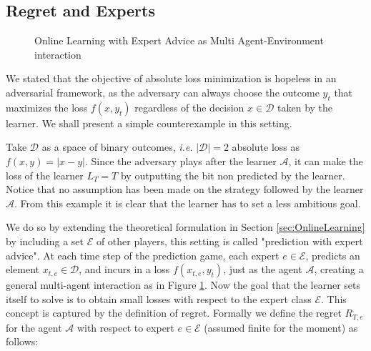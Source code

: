 


\subsection{Regret and Experts}
\begin{figure}[t!]
    \centering
    
\caption{Online Learning with Expert Advice as Multi Agent-Environment interaction}
\label{fig:OL}
\end{figure}
We stated that the objective of absolute loss minimization is hopeless in an adversarial framework, as the adversary can always choose the outcome $y_t$ that maximizes the loss $f(x,y_t)$ regardless of the decision $x\in\mathcal D$ taken by the learner. We shall present a simple counterexample in this setting.

Take $\mathcal D$ as a space of binary outcomes, \emph{i.e.} $|\mathcal D|=2$ absolute loss as $f(x,y)=|x - y|$. Since the adversary plays after the learner $\mathcal A$, it can  make the loss of the learner $L_T=T$ by outputting the bit non predicted by the learner. Notice that no assumption has been made on the strategy followed by the learner $\mathcal A$.
From this example it is clear that the learner has to set a less ambitious goal.

We do so by extending the theoretical formulation in Section \ref{sec:OnlineLearning} by including a set $\mathcal E$ of other players, this setting is called "prediction with expert advice". At each time step of the prediction game, each expert $e\in\mathcal E$, predicts an element $x_{t,e}\in\mathcal D$, and incurs in a loss $f(x_{t,e},y_t)$, just as the agent $\mathcal A$, creating a general multi-agent interaction as in Figure \ref{fig:OL}.
Now the goal that the learner sets itself to solve is to obtain small losses with respect to the expert class $\mathcal E$. This concept is captured by the definition of regret.
Formally we define the regret $R_{T,e}$ for the agent $\mathcal A$ with respect to expert $e\in\mathcal E$ (assumed finite for the moment) as follows:

